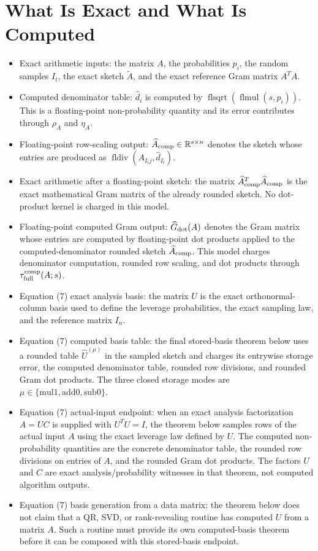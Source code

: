 \documentclass[11pt]{article}
\newcommand{\R}{\mathbb{R}}
\newcommand{\Atil}{\widetilde A}
\newcommand{\Ahat}{\widehat A}
\newcommand{\Ghat}{\widehat G}
\newcommand{\I}{I}
\theoremstyle{remark}
\begin{document}
\section*{What Is Exact and What Is Computed}

\begin{itemize}
  \item Exact arithmetic inputs: the matrix \(A\), the probabilities \(p_i\),
  the random samples \(I_t\), the exact sketch \(\Atil\), and the exact
  reference Gram matrix \(A^TA\).
  \item Computed denominator table: \(\widehat d_i\) is computed by
  \(\operatorname{flsqrt}(\operatorname{flmul}(s,p_i))\).  This is a
  floating-point non-probability quantity and its error contributes through
  \(\rho_A\) and \(\eta_A\).
  \item Floating-point row-scaling output:
  \(\Ahat_{\rm comp}\in\R^{s\times n}\) denotes the sketch whose entries are
  produced as \(\operatorname{fldiv}(A_{I_tj},\widehat d_{I_t})\).
  \item Exact arithmetic after a floating-point sketch: the matrix
  \(\Ahat_{\rm comp}^T\Ahat_{\rm comp}\) is the exact mathematical Gram matrix
  of the already rounded sketch.  No dot-product kernel is charged in this
  model.
  \item Floating-point computed Gram output: \(\Ghat_{\rm dot}(A)\) denotes the
  Gram matrix whose entries are computed by floating-point dot products applied
  to the computed-denominator rounded sketch \(\Ahat_{\rm comp}\).  This model
  charges denominator computation, rounded row scaling, and dot products through
  \(\tau_{\rm full}^{\rm comp}(A;s)\).
  \item Equation (7) exact analysis basis: the matrix \(U\) is the exact
  orthonormal-column basis used to define the leverage probabilities, the exact
  sampling law, and the reference matrix \(\I_n\).
  \item Equation (7) computed basis table: the final stored-basis theorem below
  uses a rounded table \(\widehat U^{(\mu)}\) in the sampled sketch and charges
  its entrywise storage error, the computed denominator table, rounded row
  divisions, and rounded Gram dot products.  The three closed storage modes are
  \(\mu\in\{\mathrm{mul1},\mathrm{add0},\mathrm{sub0}\}\).
  \item Equation (7) actual-input endpoint: when an exact analysis
  factorization \(A=UC\) is supplied with \(U^TU=I\), the theorem below samples
  rows of the actual input \(A\) using the exact leverage law defined by \(U\).
  The computed non-probability quantities are the concrete denominator table,
  the rounded row divisions on entries of \(A\), and the rounded Gram dot
  products.  The factors \(U\) and \(C\) are exact analysis/probability
  witnesses in that theorem, not computed algorithm outputs.
  \item Equation (7) basis generation from a data matrix: the theorem below
  does not claim that a QR, SVD, or rank-revealing routine has computed \(U\)
  from a matrix \(A\).  Such a routine must provide its own computed-basis
  theorem before it can be composed with this stored-basis endpoint.
\end{itemize}
\end{document}
